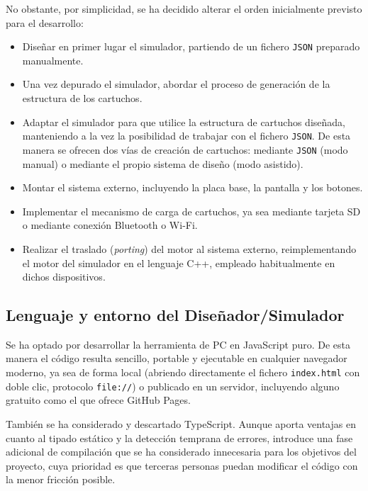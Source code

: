 \documentclass[../main.tex]{subfiles}
\begin{document}
	No obstante, por simplicidad, se ha decidido alterar el orden inicialmente previsto para el desarrollo:

	\begin{itemize}
		\item Diseñar en primer lugar el simulador, partiendo de un fichero \texttt{JSON} preparado manualmente.
		\item Una vez depurado el simulador, abordar el proceso de generación de la estructura de los cartuchos.
		\item Adaptar el simulador para que utilice la estructura de cartuchos diseñada, manteniendo a la vez la posibilidad de trabajar con el fichero \texttt{JSON}. De esta manera se ofrecen dos vías de creación de cartuchos: mediante \texttt{JSON} (modo manual) o mediante el propio sistema de diseño (modo asistido).
		\item Montar el sistema externo, incluyendo la placa base, la pantalla y los botones.
		\item Implementar el mecanismo de carga de cartuchos, ya sea mediante tarjeta SD o mediante conexión Bluetooth o Wi-Fi.
		\item Realizar el traslado (\textit{porting}) del motor al sistema externo, reimplementando el motor del simulador en el lenguaje C++, empleado habitualmente en dichos dispositivos.
	\end{itemize}

\subsection{Lenguaje y entorno del Diseñador/Simulador}
\label{sec:LenguajeEntorno}

Se ha optado por desarrollar la herramienta de PC en JavaScript puro. De esta manera el código resulta sencillo, portable y ejecutable en cualquier navegador moderno, ya sea de forma local (abriendo directamente el fichero \texttt{index.html} con doble clic, protocolo \texttt{file://}) o publicado en un servidor, incluyendo alguno gratuito como el que ofrece GitHub Pages.

También se ha considerado y descartado TypeScript. Aunque aporta ventajas en cuanto al tipado estático y la detección temprana de errores, introduce una fase adicional de compilación que se ha considerado innecesaria para los objetivos del proyecto, cuya prioridad es que terceras personas puedan modificar el código con la menor fricción posible.
\end{document}
